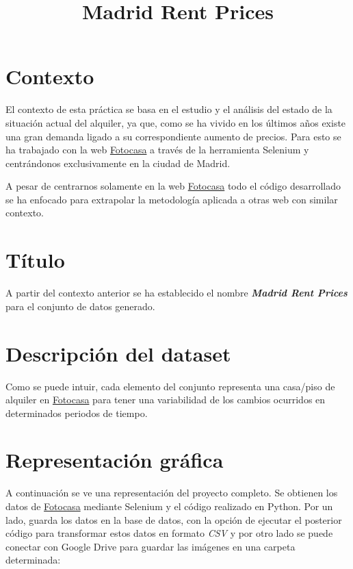 \title{Madrid Rent Prices}
\maketitle

\section{Contexto}

El contexto de esta práctica se basa en el estudio y el análisis del estado de la situación actual del alquiler,
 ya que, como se ha vivido en los últimos años existe una gran demanda ligado a su correspondiente aumento de 
 precios. Para esto se ha trabajado con la web \href{https://www.fotocasa.es/es/}{Fotocasa} a través de la 
 herramienta Selenium y centrándonos exclusivamente en la ciudad de Madrid.

A pesar de centrarnos solamente en la web \href{https://www.fotocasa.es/es/}{Fotocasa} todo el código desarrollado 
se ha enfocado para extrapolar la metodología aplicada a otras web con similar contexto.

\section{Título}

A partir del contexto anterior se ha establecido el nombre \textit{\textbf{Madrid Rent Prices}} 
para el conjunto de datos generado.

\section{Descripción del dataset}

Como se puede intuir, cada elemento del conjunto representa una casa/piso de alquiler 
en \href{https://www.fotocasa.es/es/) y sus correspondientes atributos los cuales se describirán 
en las siguientes secciones. Estos elementos se han obtenido en diversos días durante el mes de 
abril de este año (2022}{Fotocasa} para tener una variabilidad de los cambios ocurridos en determinados 
periodos de tiempo.

\section{Representación gráfica}

A continuación se ve una representación del proyecto completo. Se obtienen los datos de 
\href{https://www.fotocasa.es/es/}{Fotocasa} mediante Selenium y el código realizado en Python. 
Por un lado, guarda los datos en la base de datos, con la opción de ejecutar el posterior código 
para transformar estos datos en formato \textit{CSV} y por otro lado se puede conectar con Google Drive 
para guardar las imágenes en una carpeta determinada:

